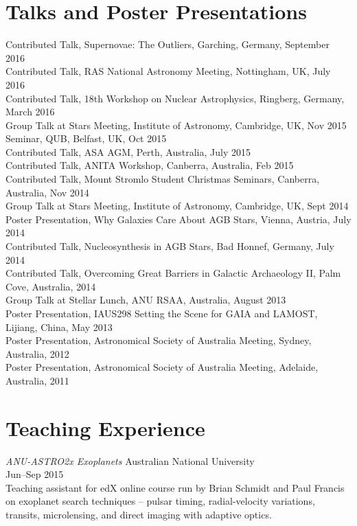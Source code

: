 \documentclass[11pt]{res} %
\begin{document}
\begin{resume}
\section{Talks and Poster Presentations}
  Contributed Talk, Supernovae: The Outliers, Garching, Germany, September 2016\\
  Contributed Talk, RAS National Astronomy Meeting, Nottingham, UK, July 2016\\
  Contributed Talk, 18th Workshop on Nuclear Astrophysics, Ringberg, Germany, March 2016\\
  Group Talk at Stars Meeting, Institute of Astronomy, Cambridge, UK, Nov 2015\\
  Seminar, QUB, Belfast, UK, Oct 2015\\
  Contributed Talk, ASA AGM, Perth, Australia, July 2015\\
  Contributed Talk, ANITA Workshop, Canberra, Australia, Feb 2015\\
  Contributed Talk, Mount Stromlo Student Christmas Seminars, Canberra, Australia, Nov 2014\\
  Group Talk at Stars Meeting, Institute of Astronomy, Cambridge, UK, Sept 2014\\
  Poster Presentation, Why Galaxies Care About AGB Stars, Vienna, Austria, July 2014\\
  Contributed Talk, Nucleosynthesis in AGB Stars, Bad Honnef, Germany, July 2014\\
  Contributed Talk, Overcoming Great Barriers in Galactic Archaeology II, Palm Cove, Australia, 2014\\
  Group Talk at Stellar Lunch, ANU RSAA, Australia, August 2013\\
  Poster Presentation, IAUS298 Setting the Scene for GAIA and LAMOST, Lijiang, China, May 2013\\
  Poster Presentation, Astronomical Society of Australia Meeting, Sydney, Australia, 2012\\
  Poster Presentation, Astronomical Society of Australia Meeting, Adelaide, Australia, 2011

\section{Teaching Experience}
  {\it ANU-ASTRO2x Exoplanets} \hfill Australian National University\\
  \null\hfill Jun--Sep 2015\\
  Teaching assistant for edX online course run by Brian Schmidt and Paul Francis on exoplanet search techniques -- pulsar timing, radial-velocity variations, transits, microlensing, and direct imaging with adaptive optics.\\


\end{resume}
\end{document}
